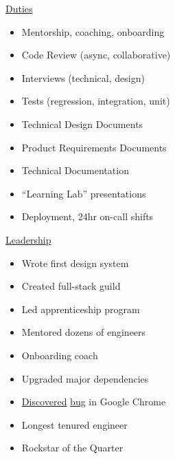 \documentclass[]{article}
\begin{document}
\hfill
\begin{minipage}[t]{.3\linewidth}
	\uline{Duties}
    \begin{itemize}[label={},leftmargin=0pt]
        \item Mentorship, coaching, onboarding
        \item Code Review (async, collaborative)
        \item Interviews (technical, design)
        \item Tests (regression, integration, unit)
        \item Technical Design Documents
        \item Product Requirements Documents
		\item Technical Documentation
        \item “Learning Lab” presentations
        \item Deployment, 24hr on-call shifts
    \end{itemize}
\end{minipage}
\hfill
\begin{minipage}[t]{0.27\linewidth}
    \uline{Leadership}
    \begin{itemize}[label={},leftmargin=0pt]
        \item Wrote first design system
        \item Created full-stack guild
        \item Led apprenticeship program
		\item Mentored dozens of engineers
        \item Onboarding coach
        \item Upgraded major dependencies
		\item \href{https://bugzilla.mozilla.org/show_bug.cgi?id=1708064}{Discovered} \href{https://bugs.chromium.org/p/chromium/issues/detail?id=1204473}{bug} in Google Chrome
        \item Longest tenured engineer
        \item Rockstar of the Quarter
    \end{itemize}
\end{minipage}
\end{document}
